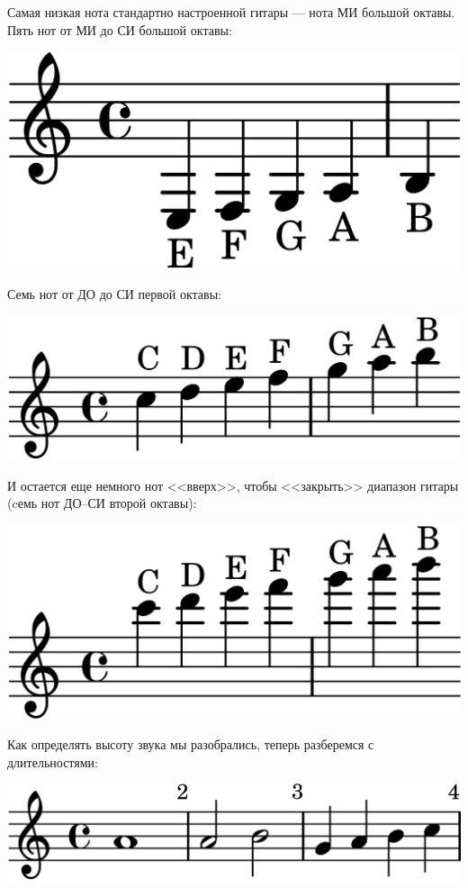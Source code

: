 Самая низкая нота стандартно настроенной гитары --- нота МИ большой октавы. Пять нот от МИ до СИ большой октавы:
\begin{center}    
    \includegraphics{fig/notes/octave-big}
\end{center}

Семь нот от ДО до СИ первой октавы:
\begin{center}    
    \includegraphics{fig/notes/octave-first}
\end{center}

И остается еще немного нот <<вверх>>, чтобы <<закрыть>> диапазон гитары (cемь нот ДО--СИ второй октавы):
\begin{center}    
    \includegraphics{fig/notes/octave-second}
\end{center}

Как определять высоту звука мы разобрались, теперь разберемся с длительностями:
\begin{center}    
    \includegraphics{fig/notes/time-4-4}
\end{center}

